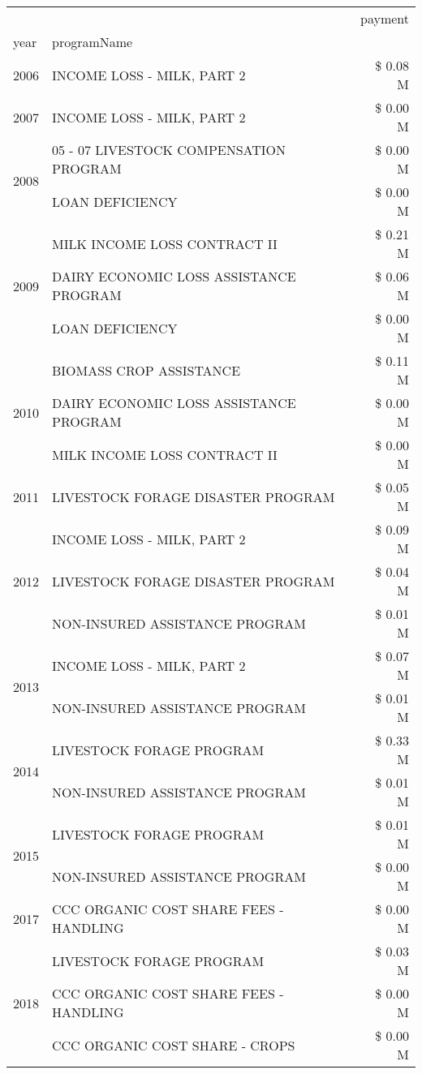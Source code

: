 \begin{tabular}{llr}
\toprule
 &  & payment \\
year & programName &  \\
\midrule
2006 & INCOME LOSS - MILK, PART 2 & \$ 0.08 M \\
\cline{1-3}
2007 & INCOME LOSS - MILK, PART 2 & \$ 0.00 M \\
\cline{1-3}
\multirow[t]{2}{*}{2008} & 05 - 07 LIVESTOCK COMPENSATION PROGRAM & \$ 0.00 M \\
 & LOAN DEFICIENCY & \$ 0.00 M \\
\cline{1-3}
\multirow[t]{3}{*}{2009} & MILK INCOME LOSS CONTRACT II & \$ 0.21 M \\
 & DAIRY ECONOMIC LOSS ASSISTANCE PROGRAM & \$ 0.06 M \\
 & LOAN DEFICIENCY & \$ 0.00 M \\
\cline{1-3}
\multirow[t]{3}{*}{2010} & BIOMASS CROP ASSISTANCE & \$ 0.11 M \\
 & DAIRY ECONOMIC LOSS ASSISTANCE PROGRAM & \$ 0.00 M \\
 & MILK INCOME LOSS CONTRACT II & \$ 0.00 M \\
\cline{1-3}
2011 & LIVESTOCK FORAGE DISASTER PROGRAM & \$ 0.05 M \\
\cline{1-3}
\multirow[t]{3}{*}{2012} & INCOME LOSS - MILK, PART 2 & \$ 0.09 M \\
 & LIVESTOCK FORAGE DISASTER PROGRAM & \$ 0.04 M \\
 & NON-INSURED ASSISTANCE PROGRAM & \$ 0.01 M \\
\cline{1-3}
\multirow[t]{2}{*}{2013} & INCOME LOSS - MILK, PART 2 & \$ 0.07 M \\
 & NON-INSURED ASSISTANCE PROGRAM & \$ 0.01 M \\
\cline{1-3}
\multirow[t]{2}{*}{2014} & LIVESTOCK FORAGE PROGRAM & \$ 0.33 M \\
 & NON-INSURED ASSISTANCE PROGRAM & \$ 0.01 M \\
\cline{1-3}
\multirow[t]{2}{*}{2015} & LIVESTOCK FORAGE PROGRAM & \$ 0.01 M \\
 & NON-INSURED ASSISTANCE PROGRAM & \$ 0.00 M \\
\cline{1-3}
2017 & CCC ORGANIC COST SHARE FEES - HANDLING & \$ 0.00 M \\
\cline{1-3}
\multirow[t]{3}{*}{2018} & LIVESTOCK FORAGE PROGRAM & \$ 0.03 M \\
 & CCC ORGANIC COST SHARE FEES - HANDLING & \$ 0.00 M \\
 & CCC ORGANIC COST SHARE - CROPS & \$ 0.00 M \\

\end{tabular}
